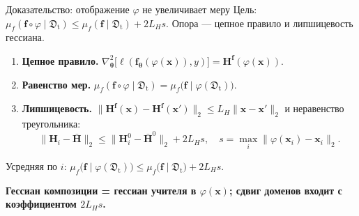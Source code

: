 \documentclass[9pt,pdf,hyperref={unicode}]{beamer}
\newcommand{\key}[1]{\par\vspace{0.5ex}\noindent\textbf{\color{darkgreen}#1}}
\begin{document}
\begin{frame}{Доказательство: отображение $\varphi$ не увеличивает меру}
\justifying
\footnotesize
\vspace{-2pt}
Цель: $\mu_f(\mathbf{f}\circ\varphi\mid\mathfrak{D}_{\mathrm{t}})\le\mu_f(\mathbf{f}\mid\mathfrak{D}_{\mathrm{t}})+2L_H s$. Опора --- цепное правило и липшицевость гессиана.
\begin{enumerate}[1)]
    \item \textbf{Цепное правило.} $\nabla^2_{\boldsymbol{\theta}}\bigl[\ell(\mathbf{f}_{\boldsymbol{\theta}}(\varphi(\mathbf{x})),y)\bigr]=\mathbf{H}^{\mathbf{f}}(\varphi(\mathbf{x}))$.
    \item \textbf{Равенство мер.} $\mu_f(\mathbf{f}\circ\varphi\mid\mathfrak{D}_{\mathrm{t}})=\mu_f\bigl(\mathbf{f}\mid\varphi(\mathfrak{D}_{\mathrm{t}})\bigr)$.
    \item \textbf{Липшицевость.} $\bigl\|\mathbf{H}^{\mathbf{f}}(\mathbf{x})-\mathbf{H}^{\mathbf{f}}(\mathbf{x}')\bigr\|_2\le L_H\|\mathbf{x}-\mathbf{x}'\|_2$ и неравенство треугольника:
    \[
        \bigl\|\mathbf{H}_i-\bar{\mathbf{H}}\bigr\|_2\le\bigl\|\mathbf{H}_i^{0}-\bar{\mathbf{H}}^{0}\bigr\|_2+2L_H s,\quad s=\max_i\|\varphi(\mathbf{x}_i)-\mathbf{x}_i\|_2.
    \]
\end{enumerate}
Усредняя по $i$: $\mu_f\bigl(\mathbf{f}\mid\varphi(\mathfrak{D}_{\mathrm{t}})\bigr)\le\mu_f\bigl(\mathbf{f}\mid\mathfrak{D}_{\mathrm{t}}\bigr)+2L_H s$.
\vspace{-2pt}
\key{Гессиан композиции = гессиан учителя в $\varphi(\mathbf{x})$; сдвиг доменов входит с коэффициентом $2L_H s$.}
\end{frame}
\end{document}
